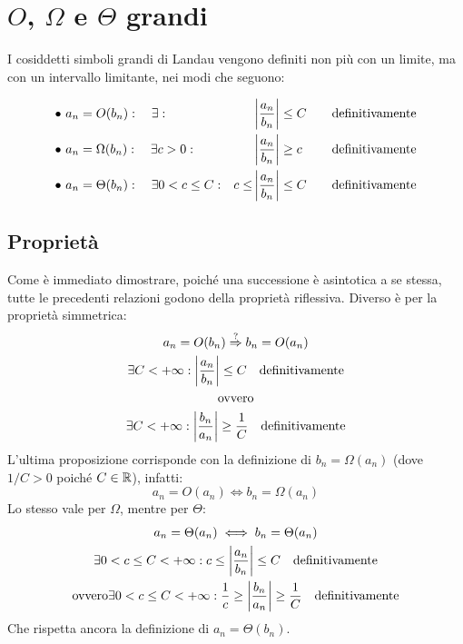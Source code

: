 %
%
%
%


\section{\texorpdfstring{$O$, $\Omega$ e $\Theta$}{O, Omega e Theta} grandi}
I cosiddetti simboli grandi di Landau vengono definiti non più con un limite, ma con un intervallo limitante, nei modi che seguono:
\begin{defin}
	\begin{align*}
		\bullet~ & a_n=O(b_n):\quad\exists:                &       & \left\lvert \frac{a_n}{b_n} \right\rvert\leq C\quad & \text{definitivamente} \\
		\bullet~ & a_n=\Omega(b_n):\quad\exists c>0:       &       & \left\lvert \frac{a_n}{b_n} \right\rvert\geq c\quad & \text{definitivamente} \\
		\bullet~ & a_n=\Theta(b_n):\quad\exists 0<c\leq C: & c\leq & \left\lvert \frac{a_n}{b_n} \right\rvert\leq C\quad & \text{definitivamente}
	\end{align*}
\end{defin}

\subsection{Proprietà}
Come è immediato dimostrare, poiché una successione è asintotica a se stessa, tutte le precedenti relazioni godono della proprietà riflessiva. Diverso è per la proprietà simmetrica:
\begin{gather*}
	a_n=O(b_n)\overset{?}{\Rightarrow} b_n=O(a_n)\\
	\exists C<+\infty: \left\lvert \frac{a_n}{b_n} \right\rvert\leq C\quad\text{definitivamente}\\
	\text{ovvero}\\
	\exists C<+\infty: \left\lvert \frac{b_n}{a_n} \right\rvert\geq \frac{1}{C}\quad\text{definitivamente}
\end{gather*}
L'ultima proposizione corrisponde con la definizione di $b_n=\Omega(a_n)$ (dove $1/C>0$ poiché $C\in\mathbb{R}$), infatti:
\[
	a_n=O(a_n)\iff b_n=\Omega(a_n)
\]
Lo stesso vale per $\Omega$, mentre per $\Theta$:
\begin{gather*}
	a_n=\Theta(a_n)\iff b_n=\Theta(a_n)\\
	\exists 0<c\leq C<+\infty: c\leq\left\lvert \frac{a_n}{b_n} \right\rvert\leq C\quad\text{definitivamente}\\
	\text{ovvero}
	\exists 0<c\leq C<+\infty: \frac{1}{c}\geq\left\lvert \frac{b_n}{a_n} \right\rvert\geq\frac{1}{C}\quad\text{definitivamente}
\end{gather*}
Che rispetta ancora la definizione di $a_n=\Theta(b_n)$.

